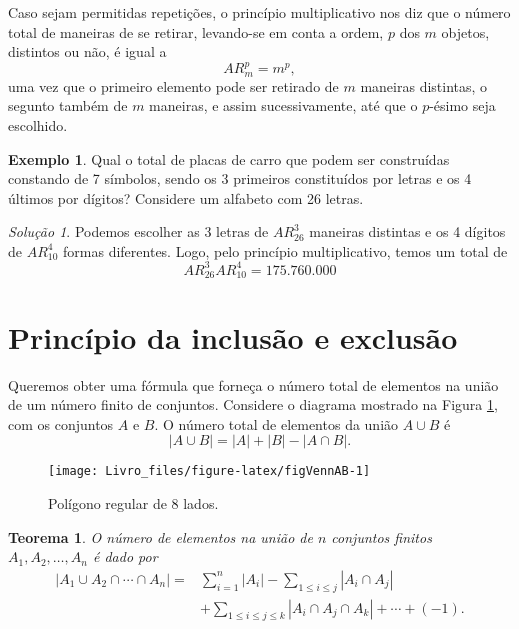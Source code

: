 \documentclass[]{book}
\newtheorem{theorem}{Teorema}[chapter]
\theoremstyle{definition}
\theoremstyle{definition}
\newtheorem{example}{Exemplo}[chapter]
\theoremstyle{definition}
\theoremstyle{remark}
\newtheorem*{solution}{Solução}
\begin{document}
Caso sejam permitidas repetições, o princípio multiplicativo nos diz que o número total de maneiras de se retirar, levando-se em conta a ordem, \(p\) dos \(m\) objetos, distintos ou não, é igual a
\[AR_m^p = m^p,\]
uma vez que o primeiro elemento pode ser retirado de \(m\) maneiras distintas, o segunto também de \(m\) maneiras, e assim sucessivamente, até que o \(p\)-ésimo seja escolhido.

\begin{example}
\protect\hypertarget{exm:unnamed-chunk-91}{}{\label{exm:unnamed-chunk-91} }Qual o total de placas de carro que podem ser construídas constando de 7 símbolos, sendo os 3 primeiros constituídos por letras e os 4 últimos por dígitos? Considere um alfabeto com 26 letras.
\end{example}

\begin{solution}
\iffalse{} {Solução. } \fi{}Podemos escolher as 3 letras de \(AR_{26}^{3}\) maneiras distintas e os 4 dígitos de \(AR_{10}^{4}\) formas diferentes.
Logo, pelo princípio multiplicativo, temos um total de
\[AR_{26}^{3}AR_{10}^{4} = 175.760.000\]
\end{solution}

\hypertarget{princuxedpio-da-inclusuxe3o-e-exclusuxe3o}{%
\section{Princípio da inclusão e exclusão}\label{princuxedpio-da-inclusuxe3o-e-exclusuxe3o}}

Queremos obter uma fórmula que forneça o número total de elementos na união de um número finito de conjuntos.
Considere o diagrama mostrado na Figura \ref{fig:figVennAB}, com os conjuntos \(A\) e \(B\).
O número total de elementos da união \(A \cup B\) é
\[|A\cup B| = |A| + |B| - |A\cap B|.\]

\begin{figure}

{\centering \texttt{[image: Livro\_files/figure-latex/figVennAB-1]} 

}

\caption{Polígono regular de 8 lados.}\label{fig:figVennAB}
\end{figure}

\begin{theorem}
\protect\hypertarget{thm:teoPrincInclExcl}{}{\label{thm:teoPrincInclExcl} }O número de elementos na união de \(n\) conjuntos finitos \(A_1, A_2, \ldots, A_n\) é dado por
\begin{align}
|A_1 \cup A_2 \cap \cdots \cap A_n| = &\sum_{i=1}^{n} |A_i| - \sum_{1\leq i\leq j} |A_i \cap A_j|\\
  &+ \sum_{1\leq i\leq j\leq k} |A_i \cap A_j \cap A_k| + \cdots + (-1).
\label{eq:inclusaoExclusao}
\end{align}
\end{theorem}
\end{document}
